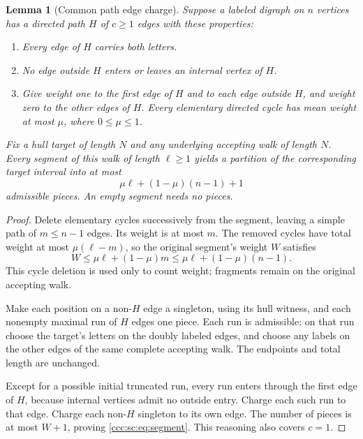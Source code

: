 \documentclass[11pt,letterpaper]{article}
\newtheorem{lemma}[theorem]{Lemma}
\theoremstyle{definition}
\theoremstyle{remark}
\begin{document}
\begin{lemma}[Common path edge charge]\label{ccc:sc:lem:charge}
Suppose a labeled digraph on $n$ vertices has a directed path $H$ of $c\ge1$ edges with these properties:
\begin{enumerate}
\item Every edge of $H$ carries both letters.
\item No edge outside $H$ enters or leaves an internal vertex of $H$.
\item Give weight one to the first edge of $H$ and to each edge outside $H$, and weight zero to the other edges of $H$. Every elementary directed cycle has mean weight at most $\mu$, where $0\le\mu\le1$.
\end{enumerate}
Fix a hull target of length $N$ and any underlying accepting walk of length $N$. Every segment of this walk of length $\ell\ge1$ yields a partition of the corresponding target interval into at most
\begin{equation}\label{ccc:sc:eq:segment}
 \mu\ell+(1-\mu)(n-1)+1
\end{equation}
admissible pieces. An empty segment needs no pieces.
\end{lemma}
\begin{proof}
Delete elementary cycles successively from the segment, leaving a simple path of $m\le n-1$ edges. Its weight is at most $m$. The removed cycles have total weight at most $\mu(\ell-m)$, so the original segment's weight $W$ satisfies
\begin{equation}\label{ccc:sc:eq:weight}
 W\le\mu\ell+(1-\mu)m\le\mu\ell+(1-\mu)(n-1).
\end{equation}
This cycle deletion is used only to count weight; fragments remain on the original accepting walk.

Make each position on a non-$H$ edge a singleton, using its hull witness, and each nonempty maximal run of $H$ edges one piece. Each run is admissible: on that run choose the target's letters on the doubly labeled edges, and choose any labels on the other edges of the same complete accepting walk. The endpoints and total length are unchanged.

Except for a possible initial truncated run, every run enters through the first edge of $H$, because internal vertices admit no outside entry. Charge each such run to that edge. Charge each non-$H$ singleton to its own edge. The number of pieces is at most $W+1$, proving \eqref{ccc:sc:eq:segment}. This reasoning also covers $c=1$.
\end{proof}
\end{document}
